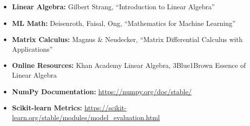 \documentclass{article}
\begin{document}
\begin{itemize}
    \item \textbf{Linear Algebra:} Gilbert Strang, ``Introduction to Linear Algebra''
    \item \textbf{ML Math:} Deisenroth, Faisal, Ong, ``Mathematics for Machine Learning'' 
    \item \textbf{Matrix Calculus:} Magnus \& Neudecker, ``Matrix Differential Calculus with Applications''
    \item \textbf{Online Resources:} Khan Academy Linear Algebra, 3Blue1Brown Essence of Linear Algebra
    \item \textbf{NumPy Documentation:} \url{https://numpy.org/doc/stable/}
    \item \textbf{Scikit-learn Metrics:} \url{https://scikit-learn.org/stable/modules/model_evaluation.html}
\end{itemize}
\end{document}
